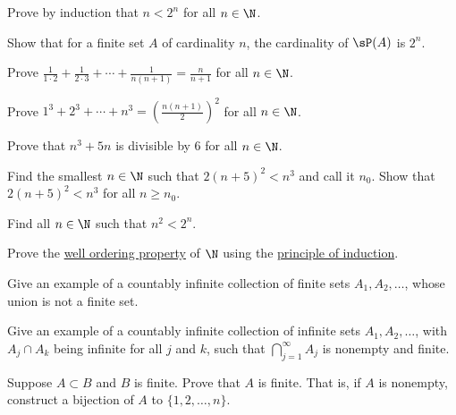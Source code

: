 \begin{exercise}
\pagebreak[2]
Prove by induction that $n < 2^n$ for all $n \in \N$.
\end{exercise}

\begin{exercise}
Show that for a finite set $A$ of cardinality $n$, the cardinality
of $\sP(A)$ is $2^n$.
\end{exercise}

\begin{exercise}
Prove $\frac{1}{1\cdot 2} + 
\frac{1}{2\cdot 3} + \cdots + \frac{1}{n(n+1)} = \frac{n}{n+1}$
for all $n \in \N$.
\end{exercise}

\begin{exercise}
Prove $1^3 + 2^3 + \cdots + n^3 = {\left( \frac{n(n+1)}{2} \right)}^2$
for all $n \in \N$.
\end{exercise}

\begin{exercise}
Prove that $n^3 + 5n$ is divisible by $6$ for all $n \in \N$.
\end{exercise}

\begin{exercise}
Find the smallest $n \in \N$ such that $2{(n+5)}^2 < n^3$ and call it $n_0$.
Show that $2{(n+5)}^2 < n^3$ for all $n \geq n_0$.
\end{exercise}

\begin{exercise}
Find all $n \in \N$ such that $n^2 < 2^n$.
\end{exercise}

\begin{exercise}
Prove the 
\hyperlink{wop:link}{well ordering property} of $\N$ using the
\hyperref[induction:thm]{principle of induction}.
\end{exercise}


\begin{exercise}
Give an example of a countably infinite collection of finite sets $A_1, A_2, \ldots$,
whose union is not a finite set.
\end{exercise}

\begin{exercise}
Give an example of a countably infinite collection of infinite sets $A_1, A_2, \ldots$,
with $A_j \cap A_k$ being infinite for all $j$ and $k$, such that
$\bigcap_{j=1}^\infty A_j$
is nonempty and finite.
\end{exercise}

\begin{exercise}
Suppose $A \subset B$ and $B$ is finite. Prove that $A$ is finite.
That is, if $A$ is nonempty, construct a bijection of $A$ to $\{ 1,2,\ldots,n \}$.
\end{exercise}

